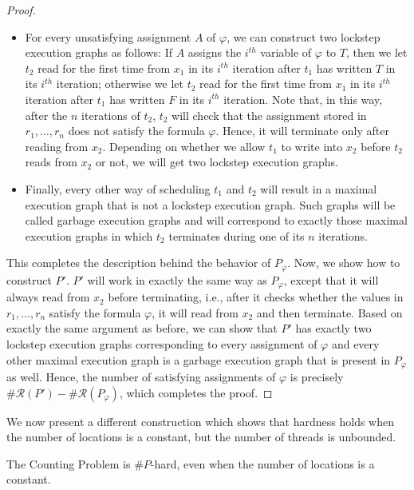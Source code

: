 \begin{proof}
\begin{itemize}
        \item For every unsatisfying assignment $A$ of $\varphi$, we can construct
        two lockstep execution graphs as follows: If $A$ assigns the $i^{th}$ variable of $\varphi$ to $T$, then we let $t_2$ read for the first time from $x_1$ in its $i^{th}$ iteration after $t_1$ has written $T$ in its $i^{th}$ iteration; otherwise we let $t_2$ read for the first time from $x_1$ in its $i^{th}$ iteration
        after $t_1$ has written $F$ in its $i^{th}$ iteration. Note that, in this way, after the $n$ iterations of $t_2$, $t_2$ will check that the assignment stored in $r_1,\dots,r_n$ does not satisfy the formula $\varphi$.
        Hence, it will terminate only after reading from $x_2$. Depending on whether
        we allow $t_1$ to write into $x_2$ before $t_2$ reads from $x_2$ or not, we will 
        get two lockstep execution graphs.

        \item Finally, every other way of scheduling $t_1$ and $t_2$ will result
        in a maximal execution graph that is not a lockstep execution graph. Such graphs
        will be called garbage execution graphs and will correspond to exactly
        those maximal execution graphs in which $t_2$ terminates during one of its $n$ iterations.
    \end{itemize}

    This completes the description behind the behavior of $P_\varphi$. Now, we show how to construct $P'$. $P'$ will work in exactly the same way as $P_\varphi$, except that
    it will always read from $x_2$ before terminating, i.e., after it checks
    whether the values in $r_1,\dots,r_n$ satisfy the formula $\varphi$, it will
    read from $x_2$ and then terminate. Based on exactly the same argument as before,
    we can show that $P'$ has exactly two lockstep execution graphs corresponding to 
    every assignment of $\varphi$ and every other maximal execution graph
    is a garbage execution graph that is present in $P_\varphi$ as well.
    Hence, the number of satisfying assignments of $\varphi$ is precisely $\#\mathcal{R}(P') - \#\mathcal{R}(P_\varphi)$, which completes the proof.
\end{proof}

We now present a different construction which shows that hardness holds when the number of locations is a constant, but the number of threads is unbounded. 

\begin{theorem}
    The Counting Problem is $\#P$-hard, even when the number of locations is a constant.
\end{theorem}

